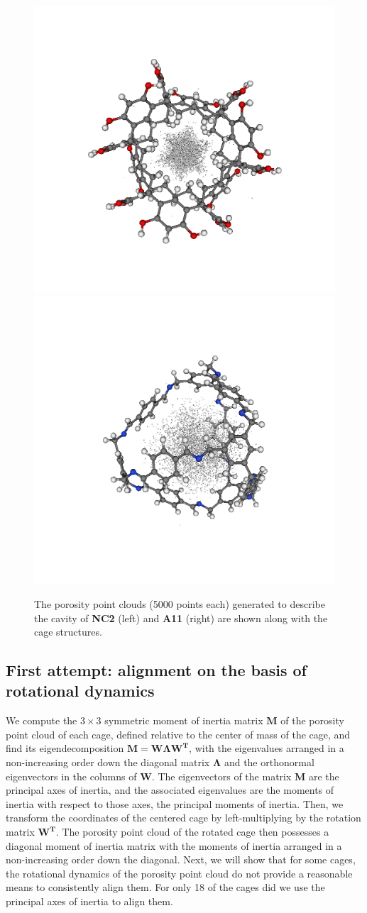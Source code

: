 \documentclass[journal=jacsat,manuscript=article]{achemso}
\begin{document}
{\begin{figure}
\centering
	\includegraphics[width=0.45\columnwidth]{NC2_porosity_point_cloud.png}
	\includegraphics[width=0.45\columnwidth]{A11_porosity_point_cloud.png}
	\caption{{\color{red} The porosity point clouds (5000 points each) generated to describe the cavity of \textbf{NC2} (left) and \textbf{A11} (right) are shown along with the cage structures.
	}%
	} \label{fig:porosity_pt_cloud}
\end{figure}

\subsection{First attempt: alignment on the basis of rotational dynamics}
\label{sec:alignment_details}
We compute the $3\times 3$ symmetric moment of inertia matrix $\mathbf{M}$ of the porosity point cloud of each cage, defined relative to the center of mass of the cage, and find its eigendecomposition $\mathbf{M}=\mathbf{W}\mathbf{\Lambda}\mathbf{W^T}$, with the eigenvalues arranged in a non-increasing order down the diagonal matrix $\mathbf{\Lambda}$ and the orthonormal eigenvectors in the columns of $\mathbf{W}$. The eigenvectors of the matrix $\mathbf{M}$ are the principal axes of inertia, and the associated eigenvalues are the moments of inertia with respect to those axes, the principal moments of inertia. Then, we transform the coordinates of the centered cage by left-multiplying by the rotation matrix $\mathbf{W^T}$. The porosity point cloud of the rotated cage then possesses a diagonal moment of inertia matrix with the moments of inertia arranged in a non-increasing order down the diagonal. Next, we will show that for some cages, the rotational dynamics of the porosity point cloud do not provide a reasonable means to consistently align them. For only 18 of the cages did we use the principal axes of inertia to align them.


}
\end{document}
